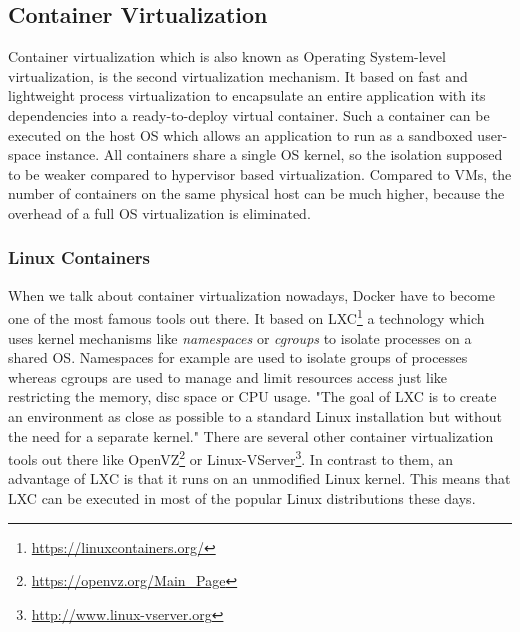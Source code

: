 \subsection{Container Virtualization}
Container virtualization which is also known as Operating System-level virtualization, is the second virtualization mechanism.
It based on fast and lightweight process virtualization to encapsulate an entire application with its dependencies into a ready-to-deploy virtual container.\cite[cf.][p. 72]{Tosatto:2015}
Such a container can be executed on the host \ac{OS} which allows an application to run as a sandboxed user-space instance.\cite[cf.][p. 1]{Anderson:2016}
All containers share a single \ac{OS} kernel, so the isolation supposed to be weaker compared to hypervisor based virtualization.\cite[cf.][p. 2]{Celesti:2016}
Compared to \acp{VM}, the number of containers on the same physical host can be much higher, because the overhead of a full \ac{OS} virtualization is eliminated.\cite[cf.][p. 2]{Celesti:2016}


\subsubsection{Linux Containers}
When we talk about container virtualization nowadays, Docker have to become one of the most famous tools out there.
It based on \ac{LXC}\footnote{\url{https://linuxcontainers.org/}} a technology which uses kernel mechanisms like \textit{namespaces} or \textit{cgroups} to isolate processes on a shared \ac{OS}.\cite[cf.][p. 381]{Pahl:2015}
Namespaces for example are used to isolate groups of processes whereas cgroups are used to manage and limit resources access just like restricting the memory, disc space or \ac{CPU} usage.\cite[cf.][p. 381]{Pahl:2015}
"The goal of \ac{LXC} is to create an environment as close as possible to a standard Linux installation but without the need for a separate kernel."\cite[p. 72]{Tosatto:2015}
There are several other container virtualization tools out there like OpenVZ\footnote{\url{https://openvz.org/Main_Page}} or Linux-VServer\footnote{\url{http://www.linux-vserver.org}}.
In contrast to them, an advantage of \ac{LXC} is that it runs on an unmodified Linux kernel.
This means that LXC can be executed in most of the popular Linux distributions these days.


